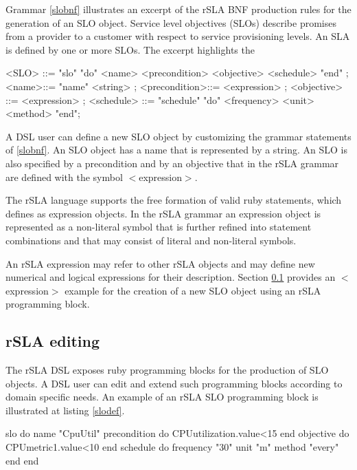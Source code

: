 Grammar \ref{slobnf} illustrates an excerpt of the rSLA BNF production rules for the generation of an SLO object. Service level objectives (SLOs) describe promises from a provider to a customer with respect to service provisioning levels\cite{wsla}. An SLA is defined by one or more SLOs. The excerpt highlights the
\begin{grammar}[caption= Service level objective (SLO) production rules, label=slobnf]
<SLO> ::= "slo" "do" <name> <precondition> <objective> <schedule> "end" ;
<name>::= "name" <string> ;
<precondition>::= <expression> ;
<objective> ::= <expression> ;
<schedule> ::= "schedule" "do" <frequency> <unit> <method> "end";
\end{grammar}
 
A DSL user can define a new SLO object by customizing the grammar statements of \ref{slobnf}. An SLO object has a name that is represented by a string. An SLO is also specified by a precondition and by an objective that in the rSLA grammar are defined with the symbol $<$expression$>$. 

The rSLA language supports the free formation of valid ruby statements, which defines as expression objects. In the rSLA grammar an expression object is represented as a non-literal symbol that is further refined into statement combinations and that may consist of literal and non-literal symbols. 

An rSLA expression may refer to other rSLA objects and may define new numerical and logical expressions for their description. Section \ref{editing} provides an $<$expression$>$ example for the creation of a new SLO object using an rSLA programming block.

\subsection{rSLA editing}\label{editing}

The rSLA DSL exposes ruby programming blocks for the production of SLO objects. A DSL user can edit and extend such programming blocks according to domain specific needs. An example of an rSLA SLO programming block is illustrated at listing \ref{slodef}.
\begin{block}[caption= rSLA SLO definition, label=slodef]
slo do
     name "CpuUtil"
     precondition do CPUutilization.value<15 end
     objective do CPUmetric1.value<10 end
     schedule do
      	frequency "30"
    	unit "m"
    	method "every"
    end
end	
\end{block}

